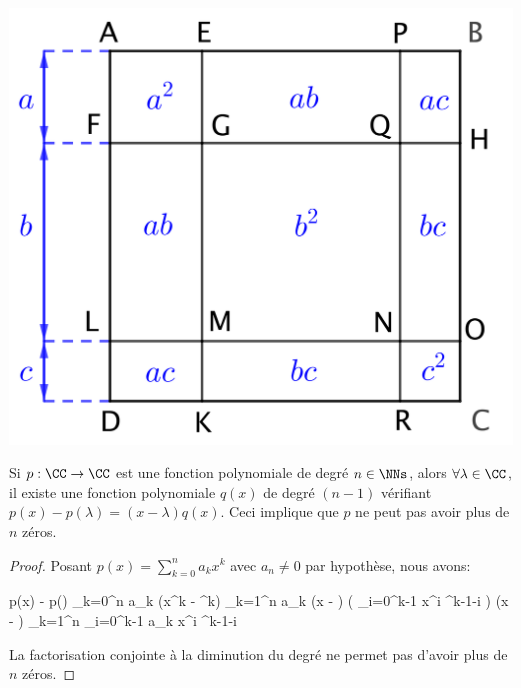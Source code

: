 \begin{center}
	\includegraphics[scale = .7]{(a+b+c)^2.png}
\end{center}




\begin{preli} \label{poly-finite-zeros}
	Si $p: \CC \rightarrow \CC$ est une fonction polynomiale de degré $n \in \NNs$,
	alors $\forall \lambda \in \CC$,
	il existe une fonction polynomiale $q(x)$ de degré $(n-1)$ vérifiant
	$p(x) - p(\lambda) = (x - \lambda) q(x)$.
	Ceci implique que $p$ ne peut pas avoir plus de $n$ zéros.
\end{preli}


\newpage
\begin{proof}
	Posant $p(x) = \sum_{k=0}^{n} a_k x^k$ avec $a_n \neq 0$ par hypothèse, nous avons:
	
	\begin{stepcalc}[style=sar]
	    p(x) - p(\lambda)
	\explnext{}
	    \dsum_{k=0}^{n} a_k (x^k - \lambda^k)
	\explnext{}
	    \dsum_{k=1}^{n} a_k (x - \lambda) \big( \sum_{i=0}^{k-1} x^i \lambda^{k-1-i} \big)
	\explnext{}
	    (x - \lambda) \dsum_{k=1}^{n} \dsum_{i=0}^{k-1} a_k x^i \lambda^{k-1-i} 
	\end{stepcalc}
	
	La factorisation conjointe à la diminution du degré ne permet pas d'avoir plus de $n$ zéros. 
\end{proof}




